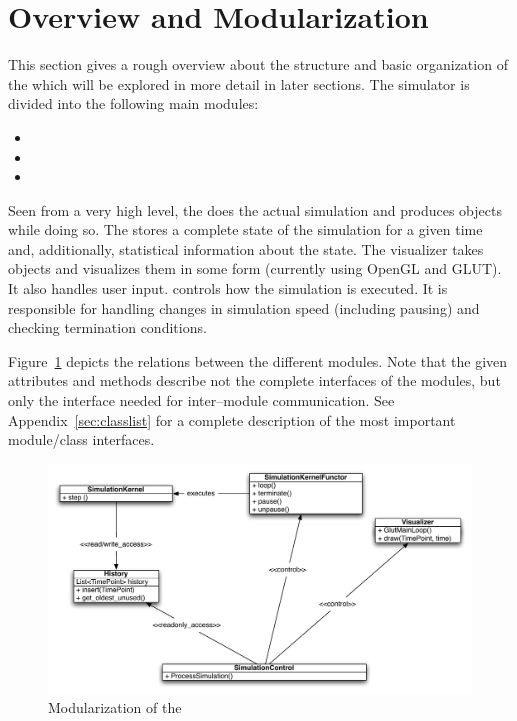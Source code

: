 \section{Overview and Modularization}\label{IG:sec:overview}

This section gives a rough overview about the structure and basic organization of the \RSS which will be explored in more detail in later sections. The simulator is divided into the following main modules:
\begin{itemize}
\item {}
\item {}
\item {}
\end{itemize}

\noindent
Seen from a very high level, the  does the actual simulation and produces  objects while doing so. The  stores a complete state of the simulation for a given time and, additionally, statistical information about the state. The visualizer takes  objects and visualizes them in some form (currently using OpenGL and GLUT). It also handles user input.  controls how the simulation is executed. It is responsible for handling changes in simulation speed (including pausing) and checking termination conditions. \smallskip

\noindent
Figure~\ref{fig:modularization} depicts the relations between the different modules. Note that the given attributes and methods describe not the complete interfaces of the modules, but only the interface needed for inter--module communication. See Appendix~\ref{sec:classlist} for a complete description of the most important module/class interfaces.\smallskip

\begin{figure}
\centering\includegraphics[width=0.85\linewidth]{chapter_reference_fig/modularization}
\caption{Modularization of the \swsim}\label{fig:modularization}
\end{figure}


